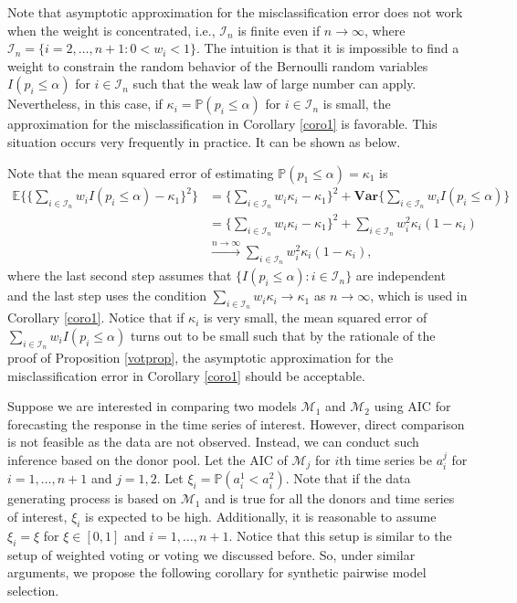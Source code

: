 \documentclass[11pt]{article}
\def\mc#1{\mathcal{#1}} %
\def\E{\mathbb{E}} %
\def\mc#1{\mathcal{#1}}
\def\var#1{\mathrm{Var}(#1)} %
\def\P{\mathbb{P}}
\def\var{\mathbf{Var}}
\theoremstyle{definition}
\begin{document}
Note that asymptotic approximation for the misclassification error does not work when the weight is concentrated, i.e., $\mc{I}_n$ is finite even if $n\to \infty$, where $\mc{I}_n = \{i =  2,\ldots, n+1\colon 0< w_i < 1\}$. The intuition is that  it is impossible to find a weight to constrain the random behavior of the Bernoulli random variables $I(p_i\leq \alpha)$ for $i \in \mc{I}_n$ such that the weak law of large number can apply.  Nevertheless, in this case, if $\kappa_i = \P(p_i\leq \alpha)$ for $i\in \mc{I}_n$ is small, the approximation for the misclassification in Corollary \ref{coro1} is favorable. This situation occurs very frequently in practice. It can be shown as below.

Note that the mean squared error of estimating $\P(p_1\leq \alpha)=\kappa_1$ is
\begin{align*}
	\E\bigg\{ \Big\{ \sum_{i\in \mc{I}_n} w_i I(p_i\leq \alpha)-\kappa_1 \Big\}^2 \bigg\}
	&= \Big\{ \sum_{i\in \mc{I}_n} w_i \kappa_i -\kappa_1 \Big\}^2 + \var 
	\Big\{\sum_{i\in \mc{I}_n} w_i I(p_i\leq \alpha) \Big\}\\
	&= \Big\{ \sum_{i\in \mc{I}_n} w_i \kappa_i -\kappa_1 \Big\}^2  + \sum_{i\in \mc{I}_n} w_i^2 \kappa_i (1-\kappa_i) \\
	& \overset{n\to \infty }{\to} \sum_{i\in \mc{I}_n} w_i^2 \kappa_i (1-\kappa_i) ,
\end{align*}
where the last second step assumes that $\{I(p_i\leq \alpha)\colon i\in \mc{I}_n\}$ are independent and the last step uses the condition $\sum_{i\in \mc{I}_n} w_i \kappa_i \to \kappa_1$ as $n\to \infty$, which is used in Corollary \ref{coro1}. Notice that if $\kappa_i$ is very small, the mean squared error of $\sum_{i\in \mc{I}_n} w_i I(p_i\leq \alpha)$ turns out to be small such that by the rationale of the proof of Proposition \ref{votprop}, the asymptotic approximation for the misclassification error in  Corollary \ref{coro1} should be acceptable.\\


\newpage



Suppose we are interested in comparing two models $\mc{M}_1$ and $\mc{M}_2$ using AIC for forecasting the response in the time series of interest. However, direct comparison is not feasible as the data are not observed. Instead, we can conduct such inference based on the donor pool. Let the AIC of $\mc{M}_j$ for $i$th time series be $a_i^j$ for $i = 1, \ldots, n+1$ and $j = 1, 2$. Let $\xi_i = \P(a_i^1 < a_i^2)$. Note that if the data generating process is based on $\mc{M}_1$ and is true for all the donors and time series of interest, $\xi_i$ is expected to be high. Additionally, it is reasonable to assume $\xi_i =\xi $ for $\xi \in [0,1]$ and $i = 1, \ldots, n+1$.  Notice that this setup is similar to the setup of weighted voting or voting we discussed before. So, under similar arguments, we propose the following corollary for synthetic pairwise model selection.
\end{document}
